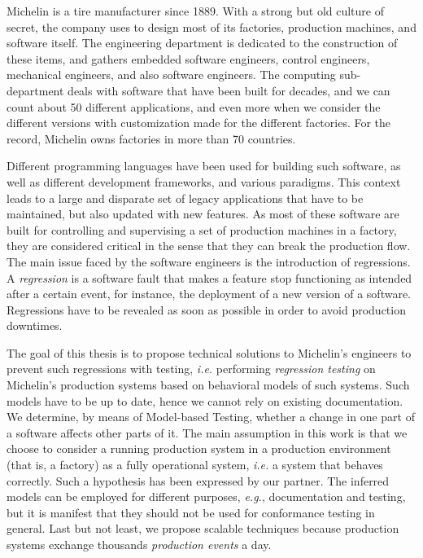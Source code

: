Michelin is a tire manufacturer since 1889. With a strong but old
culture of secret, the company uses to design most of its
factories, production machines, and software itself. The
engineering department is dedicated to the construction of these
items, and gathers embedded software engineers, control
engineers, mechanical engineers, and also software engineers. The
computing sub-department deals with software that have been built
for decades, and we can count about 50 different applications,
and even more when we consider the different versions with
customization made for the different factories. For the record,
Michelin owns factories in more than 70 countries.

Different programming languages have been used for building such
software, as well as different development frameworks, and
various paradigms. This context leads to a large and disparate
set of legacy applications that have to be maintained, but also
updated with new features. As most of these software are built
for controlling and supervising a set of production machines in a
factory, they are considered critical in the sense that they can
break the production flow. The main issue faced by the software
engineers is the introduction of regressions. A \emph{regression}
is a software fault that makes a feature stop functioning as
intended after a certain event, for instance, the deployment of a
new version of a software. Regressions have to be revealed as
soon as possible in order to avoid production downtimes.

The goal of this thesis is to propose technical solutions to
Michelin's engineers to prevent such regressions with testing,
\emph{i.e.} performing \emph{regression testing} on Michelin's
production systems based on behavioral models of such systems.
Such models have to be up to date, hence we cannot rely on
existing documentation.  We determine, by means of Model-based
Testing, whether a change in one part of a software affects other
parts of it. The main assumption in this work is that we choose
to consider a running production system in a production
environment (that is, a factory) as a fully operational system,
\emph{i.e.} a system that behaves correctly.  Such a hypothesis
has been expressed by our partner. The inferred models can be
employed for different purposes, \emph{e.g.}, documentation and
testing, but it is manifest that they should not be used for
conformance testing in general. Last but not least, we propose
scalable techniques because production systems exchange thousands
\emph{production events} a day.

